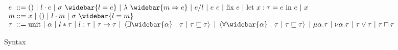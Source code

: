\documentclass[sigplan]{acmart}
\theoremstyle{definition}
\begin{document}
\begin{figure*}[h]
\[
  \begin{array}{l @{} l}
    e 
    &{} ::=
    \begin{array}[t]{@{} l}
      () 
      \ |\ 
      l \cdot e 
      \ |\ 
      \sigma\ \widebar{l = e}
      \ |\ 
      \lambda\ \widebar{m \Rightarrow e} 
      \ |\ 
      e/l
      \ |\ 
      e\ e 
      \ |\ 
      \text{fix}\ e
      \ |\ 
      \text{let}\ x : \tau = e\ \text{in}\ e
      \ |\ 
      x
    \end{array}
    \\
    m 
    &{} ::=
    \begin{array}[t]{@{} l}
      x 
      \ |\ 
      () 
      \ |\ 
      l \cdot m 
      \ |\ 
      \sigma\ \widebar{l = m}
    \end{array}
    \\
    \tau
    &{} ::=
    \begin{array}[t]{@{} l}
      \text{unit} 
      \ |\ 
      \alpha 
      \ |\ 
      l*\tau 
      \ |\ 
      l:\tau 
      \ |\ 
      \tau\rightarrow\tau 
      \ |\ 
      \left<\exists \widebar{\alpha}\ .\ \tau\ |\ \tau \sqsubseteq \tau\right>
      \ |\ 
      \left<\forall \widebar{\alpha}\ .\ \tau\ |\ \tau \sqsubseteq \tau\right>
      \ |\ 
      \mu \alpha.\tau 
      \ |\ 
      \nu \alpha.\tau 
      \ |\ 
      \tau \vee \tau
      \ |\ 
      \tau \sqcap \tau
    \end{array}
  \end{array}
\]

\caption{Syntax}
\end{figure*}


\end{document}
